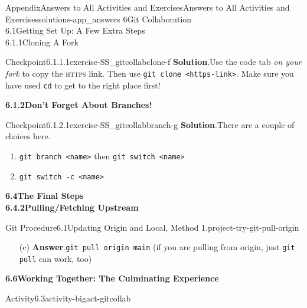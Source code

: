 \documentclass[twoside,10pt,]{book}
\newcommand{\blocktitlefont}{\relax}
\newcommand{\mono}[1]{\texttt{#1}}
\newcommand{\initialism}[1]{\textsc{\MakeLowercase{#1}}}
\begin{document}
\begin{solutions-chapter}{Appendix}{Answers to All Activities and Exercises}{}{Answers to All Activities and Exercises}{}{}{solutions-app_answers}
{6\space\textperiodcentered\space{}Git Collaboration\\
6.1\space\textperiodcentered\space{}Getting Set Up: A Few Extra Steps\\
6.1.1\space\textperiodcentered\space{}Cloning A Fork}
\begin{inlinesolution}{Checkpoint}{6.1.1.1}{}{exercise-SS_gitcollabclone-f}%
\noindent\textbf{\blocktitlefont Solution}.\hypertarget{solution-SS_gitcollabclone-f-b-back}{}\quad{}Use the code tab \emph{on your fork} to copy the \initialism{HTTPS} link. Then use \mono{git clone <https-link>}. Make sure you have used \mono{cd} to get to the right place first!%
\end{inlinesolution}%
\par\medskip
\noindent\textbf{\Large{}6.1.2\space\textperiodcentered\space{}Don't Forget About Branches!}
\begin{inlinesolution}{Checkpoint}{6.1.2.1}{}{exercise-SS_gitcollabbranch-g}%
\noindent\textbf{\blocktitlefont Solution}.\hypertarget{solution-SS_gitcollabbranch-g-b-back}{}\quad{}There are a couple of choices here.%
\begin{enumerate}
\item{}\mono{git branch <name>} then \mono{git switch <name>}%
\item{}\mono{git switch -c <name>}%
\end{enumerate}
%
\end{inlinesolution}%
\par\medskip
\noindent\textbf{\Large{}6.4\space\textperiodcentered\space{}The Final Steps\\
6.4.2\space\textperiodcentered\space{}Pulling\slash{}Fetching Upstream}
\begin{projectsolution}{Git Procedure}{6.1}{Updating Origin and Local, Method 1.}{project-try-git-pull-origin}%
\begin{enumerate}[font=\bfseries,label=(\alph*),ref=\alph*]%
\item[(c)]\noindent\textbf{\blocktitlefont Answer}.\hypertarget{answer-try-git-pull-origin-i-b-back}{}\quad{}\mono{git pull origin main} (if you are pulling from origin, just \mono{git pull} can work, too)%
\end{enumerate}%
\end{projectsolution}%
\par\medskip
\noindent\textbf{\Large{}6.6\space\textperiodcentered\space{}Working Together: The Culminating Experience}
\begin{activitysolution}{Activity}{6.3}{}{activity-bigact-gitcollab}%

\end{activitysolution}
\end{solutions-chapter}
\end{document}
